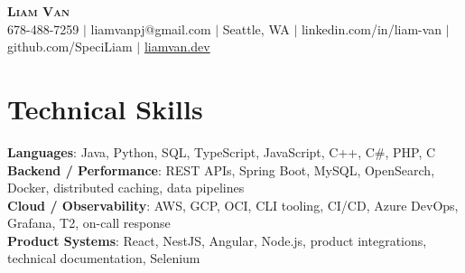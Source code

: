 \documentclass[letterpaper,11pt]{article}
\begin{document}

%
\begin{center}
    \textbf{\Huge \scshape Liam Van} \\ \vspace{1pt}
    \small 678-488-7259 $|$ \small {liamvanpj@gmail.com} $|$ Seattle, WA
 {{$|$ linkedin.com/in/liam-van} {$|$ github.com/SpeciLiam} {$|$ \href{https://liamvan.dev}{liamvan.dev}}}

\end{center}

\section{Technical Skills}
 \begin{itemize}[leftmargin=0.15in, label={}]
    \small{\item{
     \textbf{Languages}{: Java, Python, SQL, TypeScript, JavaScript, C++, C\#, PHP, C} \\
     \textbf{Backend / Performance}{: REST APIs, Spring Boot, MySQL, OpenSearch, Docker, distributed caching, data pipelines} \\
     \textbf{Cloud / Observability}{: AWS, GCP, OCI, CLI tooling, CI/CD, Azure DevOps, Grafana, T2, on-call response} \\
     \textbf{Product Systems}{: React, NestJS, Angular, Node.js, product integrations, technical documentation, Selenium} \\
    }}
 \end{itemize}
%

\end{document}
